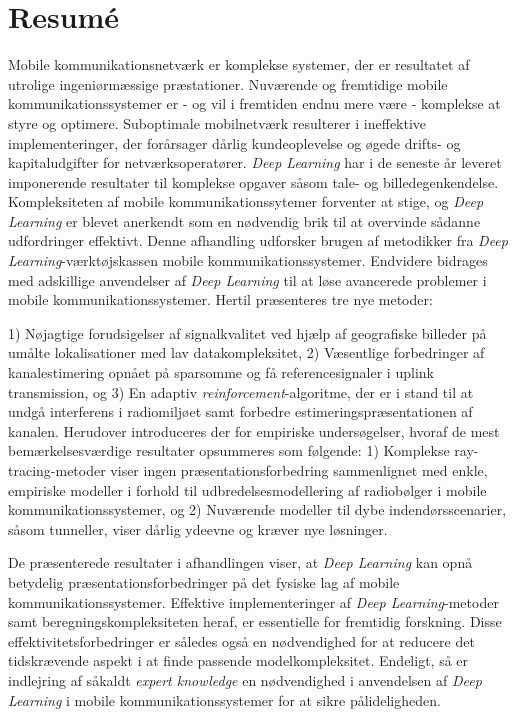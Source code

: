 \chapter*{Resumé}
Mobile kommunikationsnetværk er komplekse systemer, der er resultatet af utrolige ingeniørmæssige præstationer. Nuværende og fremtidige mobile kommunikationssystemer er - og vil i fremtiden endnu mere være - komplekse at styre og optimere. Suboptimale mobilnetværk resulterer i ineffektive implementeringer, der forårsager dårlig kundeoplevelse og øgede drifts- og kapitaludgifter for netværksoperatører. \emph{Deep Learning} har i de seneste år leveret imponerende resultater til komplekse opgaver såsom tale- og billedegenkendelse. Kompleksiteten af mobile kommunikationssytemer forventer at stige, og \emph{Deep Learning} er blevet anerkendt som en nødvendig brik til at overvinde sådanne udfordringer effektivt. 
Denne afhandling udforsker brugen af metodikker fra \emph{Deep Learning}-værktøjskassen mobile kommunikationssystemer. Endvidere bidrages med adskillige anvendelser af \emph{Deep Learning} til at løse avancerede problemer i mobile kommunikationssystemer. Hertil præsenteres tre nye metoder:

1) Nøjagtige forudsigelser af signalkvalitet ved hjælp af geografiske billeder på umålte lokalisationer med lav datakompleksitet, 2) Væsentlige forbedringer af kanalestimering opnået på sparsomme og få referencesignaler i uplink transmission, og 3) En adaptiv \emph{reinforcement}-algoritme, der er i stand til at undgå interferens i radiomiljøet samt forbedre estimeringspræsentationen af kanalen. Herudover introduceres der for empiriske undersøgelser, hvoraf de mest bemærkelsesværdige resultater opsummeres som følgende: 1) Komplekse ray-tracing-metoder viser ingen præsentationsforbedring sammenlignet med enkle, empiriske modeller i forhold til udbredelsesmodellering af radiobølger i mobile kommunikationssystemer, og 2) Nuværende modeller til dybe indendørsscenarier, såsom tunneller, viser dårlig ydeevne og kræver nye løsninger.

De præsenterede resultater i afhandlingen viser, at \emph{Deep Learning} kan opnå betydelig præsentationsforbedringer på det fysiske lag af mobile kommunikationssystemer. Effektive implementeringer af \emph{Deep Learning}-metoder samt beregningskompleksiteten heraf, er essentielle for fremtidig forskning. Disse effektivitetsforbedringer er således også en nødvendighed for at reducere det tidskrævende aspekt i at finde passende modelkompleksitet. Endeligt, så er indlejring af såkaldt \emph{expert knowledge} en nødvendighed i anvendelsen af \emph{Deep Learning} i mobile kommunikationssystemer for at sikre pålideligheden.